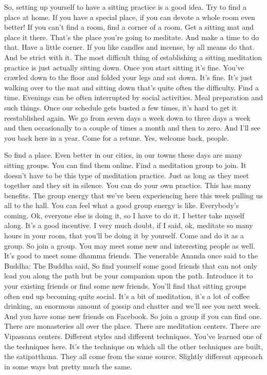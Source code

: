 \documentclass[letterpaper,10pt,english]{sphinxmanual}
\begin{document}
\sphinxAtStartPar
So, setting up yourself to have a sitting practice is a good idea. Try to
find a place at home. If you have a special place, if you can devote a whole
room even better! If you can’t find a room, find a corner of a room. Get a
sitting  mat  and  place  it  there.  That’s  the  place  you’re  going  to  meditate.
And  make  a  time  to  do  that.  Have  a  little  corner.  If  you  like  candles  and
incense, by all means do that. And be strict with it. The most difficult thing
of  establishing  a  sitting  meditation  practice  is  just  actually  sitting  down.
Once you start sitting it’s fine. You’ve crawled down to the floor and folded
your legs and sat down. It’s fine. It’s just walking over to the mat and sitting
down  that’s  quite  often  the  difficulty.  Find  a  time.  Evenings  can  be  often
interrupted by social activities. Meal preparation and such things. Once our
schedule gets busted a few times, it’s hard to get it re\sphinxhyphen{}established again. We
go from seven days a week down to three days a week and then occasionally
to a couple of times a month and then to zero. And I’ll see you back here in
a year. Come for a retune. Yes, welcome back, people.

\sphinxAtStartPar
So find a place. Even better in our cities, in our towns these days are
many sitting groups. You can find them online. Find a meditation group to
join. It doesn’t have to be this type of meditation practice. Just as long as
they  meet  together  and  they  sit  in  silence. You  can  do  your  own  practice.
This has many benefits. The group energy that we’ve been experiencing here
this week pulling us all to the hall. You can feel what a good group energy is
like. Everybody’s coming. Ok, everyone else is doing it, so I have to do it. I
better take myself along. It’s a good incentive. I very much doubt, if I said,
ok, meditate so many hours in your room, that you’ll be doing it by yourself.
Come and do it as a group. So join a group. You may meet some new and
interesting people as well. It’s good to meet some dhamma friends. The venerable Ananda once said to the Buddha:
   The Buddha
said,
So  find  yourself  some  good  friends  that
can not only lead you along the path but be your companion upon the path.
Introduce  it  to  your  existing  friends  or  find  some  new  friends. You’ll  find
that sitting groups often end up becoming quite social. It’s a bit of meditation, it’s a lot of coffee drinking, an enormous amount of gossip and chatter
and we’ll see you next week. And you have some new friends on Facebook.
So join a group if you can find one. There are monasteries all over the place.
There are meditation centers. There are Vipassana centers. Different styles
and different techniques. You’ve learned one of the techniques here. It’s the
technique on which all the other techniques are built, the satipatthana. They
all come from the same source. Slightly different approach in some ways but
pretty much the same.
\end{document}
